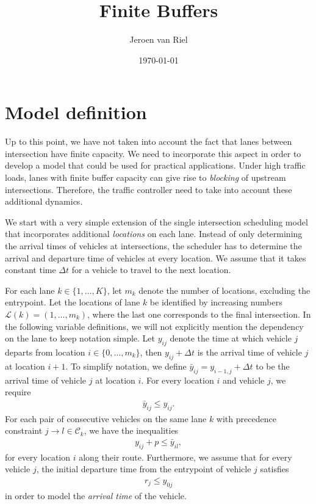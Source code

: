 \documentclass{article}
\title{Finite Buffers}
\author{Jeroen van Riel}
\date{\monthyeardate\today}
\theoremstyle{definition}
\theoremstyle{plain}
\begin{document}
\maketitle

\section{Model definition}

Up to this point, we have not taken into account the fact that lanes between
intersection have finite capacity. We need to incorporate this aspect in order
to develop a model that could be used for practical applications. Under high
traffic loads, lanes with finite buffer capacity can give rise to
\textit{blocking} of upstream intersections. Therefore, the traffic controller
need to take into account these additional dynamics.

We start with a very simple extension of the single intersection scheduling
model that incorporates additional \textit{locations} on each lane. Instead of
only determining the arrival times of vehicles at intersections, the scheduler
has to determine the arrival and departure time of vehicles at every location.
We assume that it takes constant time $\Delta t$ for a vehicle to travel to the
next location.

For each lane $k \in \{1, \dots, K\}$, let $m_{k}$ denote the number of
locations, excluding the entrypoint. Let the locations of lane $k$ be identified
by increasing numbers $\mathcal{L}(k) = (1, \dots , m_{k})$, where the last one
corresponds to the final intersection. In the following variable definitions, we
will not explicitly mention the dependency on the lane to keep notation simple.
Let $y_{ij}$ denote the time at which vehicle $j$ departs from location
$i \in \{ 0, \dots, m_{k} \}$, then $y_{ij} + \Delta t$ is the arrival time of
vehicle $j$ at location $i+1$. To simplify notation, we define
$\bar{y}_{ij} = y_{i-1,j} + \Delta t$ to be the arrival time of vehicle $j$ at
location $i$. For every location $i$ and vehicle $j$, we require
\begin{align}
  \label{eq:constr1}
  \bar{y}_{ij} \leq y_{ij} .
\end{align}
For each pair of consecutive vehicles on the same lane $k$ with precedence
constraint $j \rightarrow l \in \mathcal{C}_{k}$, we have the inequalities
\begin{align}
  \label{eq:constr2}
  y_{ij} + p \leq \bar{y}_{il} ,
\end{align}
for every location $i$ along their route. Furthermore, we assume that for every
vehicle $j$, the initial departure time from the entrypoint of vehicle $j$ satisfies
\begin{align}
  \label{eq:release}
 r_{j} \leq y_{0j}
\end{align}
in order to model the \textit{arrival time} of the vehicle.
\end{document}
